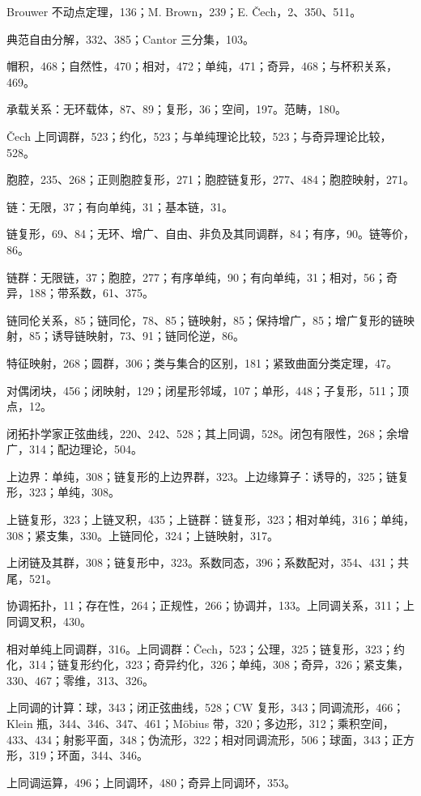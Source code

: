 Brouwer 不动点定理，136；M. Brown，239；E. Čech，2、350、511。

典范自由分解，332、385；Cantor 三分集，103。

帽积，468；自然性，470；相对，472；单纯，471；奇异，468；与杯积关系，469。

承载关系：无环载体，87、89；复形，36；空间，197。范畴，180。

Čech 上同调群，523；约化，523；与单纯理论比较，523；与奇异理论比较，528。

胞腔，235、268；正则胞腔复形，271；胞腔链复形，277、484；胞腔映射，271。

链：无限，37；有向单纯，31；基本链，31。

链复形，69、84；无环、增广、自由、非负及其同调群，84；有序，90。链等价，86。

链群：无限链，37；胞腔，277；有序单纯，90；有向单纯，31；相对，56；奇异，188；带系数，61、375。

链同伦关系，85；链同伦，78、85；链映射，85；保持增广，85；增广复形的链映射，85；诱导链映射，73、91；链同伦逆，86。

特征映射，268；圆群，306；类与集合的区别，181；紧致曲面分类定理，47。

对偶闭块，456；闭映射，129；闭星形邻域，107；单形，448；子复形，511；顶点，12。

闭拓扑学家正弦曲线，220、242、528；其上同调，528。闭包有限性，268；余增广，314；配边理论，504。

上边界：单纯，308；链复形的上边界群，323。上边缘算子：诱导的，325；链复形，323；单纯，308。

上链复形，323；上链叉积，435；上链群：链复形，323；相对单纯，316；单纯，308；紧支集，330。上链同伦，324；上链映射，317。

上闭链及其群，308；链复形中，323。系数同态，396；系数配对，354、431；共尾，521。

协调拓扑，11；存在性，264；正规性，266；协调并，133。上同调关系，311；上同调叉积，430。

相对单纯上同调群，316。上同调群：Čech，523；公理，325；链复形，323；约化，314；链复形约化，323；奇异约化，326；单纯，308；奇异，326；紧支集，330、467；零维，313、326。

上同调的计算：球，343；闭正弦曲线，528；CW 复形，343；同调流形，466；Klein 瓶，344、346、347、461；Möbius 带，320；多边形，312；乘积空间，433、434；射影平面，348；伪流形，322；相对同调流形，506；球面，343；正方形，319；环面，344、346。

上同调运算，496；上同调环，480；奇异上同调环，353。

